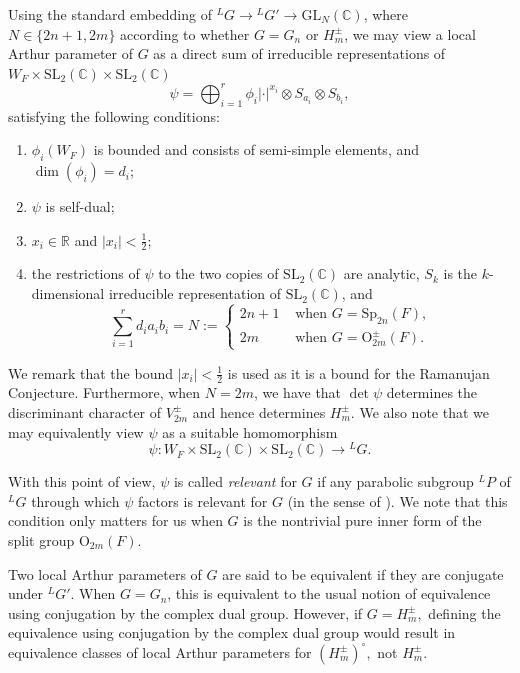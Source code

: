 \documentclass[11pt,letterpaper]{amsart}
\newcommand{\R}{\mathbb{R}}
\newcommand{\GL}{\mathrm{GL}}
\newcommand{\OO}{\mathrm{O}}
\newcommand{\SL}{\mathrm{SL}}
\newcommand{\Sp}{\mathrm{Sp}}
\newcommand{\BC}{\mathbb{C}}
\numberwithin{equation}{section}
\begin{document}
Using the standard embedding of ${}^LG\rightarrow{}^LG'\rightarrow\GL_{N}(\BC)$, where $N\in\{2n+1,2m\}$ according to whether $G=G_n$ or $H_m^\pm$, we may view
a local Arthur parameter of $G$ as
a direct sum of irreducible representations of $W_F\times\SL_2(\mathbb{C})\times\SL_2(\mathbb{C})$
\begin{equation}\label{eq decomp psi +}
  \psi = \bigoplus_{i=1}^r \phi_i|\cdot|^{x_i} \otimes S_{a_i} \otimes S_{b_i},  
\end{equation}
satisfying the following conditions:
\begin{enumerate}
    \item [(1)]$\phi_i(W_F)$ is bounded and consists of semi-simple elements, and $\dim(\phi_i)=d_i$;
    \item [(2)] $\psi$ is self-dual;
    \item [(3)] $x_i \in \R$ and $|x_i|<\frac{1}{2}$;
    \item [(4)]the restrictions of $\psi$ to the two copies of $\SL_2(\mathbb{C})$ are analytic, $S_k$ is the $k$-dimensional irreducible representation of $\SL_2(\mathbb{C})$, and 
    $$\sum_{i=1}^r d_ia_ib_i = N:= 
\begin{cases}
2n+1 & \text{ when } G=\Sp_{2n}(F),\\
2m & \text{ when } G=\OO^\pm_{2m}(F).
\end{cases}
$$ 
\end{enumerate}
We remark that the bound $|x_i|<\frac{1}{2}$ is used as it is a bound for the Ramanujan Conjecture. Furthermore, when $N=2m$, we have that $\det\psi$ determines the discriminant character of $V_{2m}^\pm$ and hence determines $H_m^\pm$.
We also note that we may equivalently view $\psi$ as a suitable homomorphism
$$\psi: W_F \times \SL_2(\mathbb{C}) \times \SL_2(\mathbb{C}) \rightarrow {}^LG.$$


With this point of view, $\psi$ is called \emph{relevant} for $G$ if any parabolic subgroup ${}^LP$ of ${}^LG$ through which $\psi$ factors is relevant for $G$ (in the sense of \cite[\S3.3]{Bor79}). We note that this condition only matters for us when $G$ is the nontrivial pure inner form of the split group $\OO_{2m}(F)$.

Two local Arthur parameters of $G$ are said to be equivalent if they are conjugate under ${}^LG'$. When  $G=G_n$, this is equivalent to the usual notion of equivalence using conjugation by the complex dual group. However, if $G=H_m^\pm,$ defining the equivalence using conjugation by the complex dual group would result in equivalence classes of local Arthur parameters for $(H_m^\pm)^\circ,$ not $H_m^\pm.$
\end{document}

